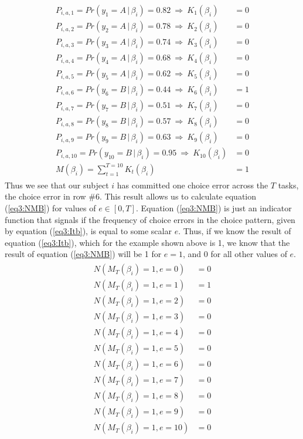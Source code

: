 \documentclass[../main.tex]{subfiles}
\begin{document}
\begin{align}
	\label{eq3:example_MTBn}
	\begin{split}
		P_{i,a,1}  = Pr(y_1 = A    \,|\, \beta_i) = 0.82 ~ \Rightarrow ~ K_{1}(\beta_i)  &= 0 \\
		P_{i,a,2}  = Pr(y_2 = A    \,|\, \beta_i) = 0.78 ~ \Rightarrow ~ K_{2}(\beta_i)  &= 0 \\
		P_{i,a,3}  = Pr(y_3 = A    \,|\, \beta_i) = 0.74 ~ \Rightarrow ~ K_{3}(\beta_i)  &= 0 \\
		P_{i,a,4}  = Pr(y_4 = A    \,|\, \beta_i) = 0.68 ~ \Rightarrow ~ K_{4}(\beta_i)  &= 0 \\
		P_{i,a,5}  = Pr(y_5 = A    \,|\, \beta_i) = 0.62 ~ \Rightarrow ~ K_{5}(\beta_i)  &= 0 \\
		P_{i,a,6}  = Pr(y_6 = B    \,|\, \beta_i) = 0.44 ~ \Rightarrow ~ K_{6}(\beta_i)  &= 1 \\
		P_{i,a,7}  = Pr(y_7 = B    \,|\, \beta_i) = 0.51 ~ \Rightarrow ~ K_{7}(\beta_i)  &= 0 \\
		P_{i,a,8}  = Pr(y_8 = B    \,|\, \beta_i) = 0.57 ~ \Rightarrow ~ K_{8}(\beta_i)  &= 0 \\
		P_{i,a,9}  = Pr(y_9 = B    \,|\, \beta_i) = 0.63 ~ \Rightarrow ~ K_{9}(\beta_i)  &= 0 \\
		P_{i,a,10} = Pr(y_{10} = B \,|\, \beta_i) = 0.95 ~ \Rightarrow ~ K_{10}(\beta_i) &= 0 \\
		                                M(\beta_i) = \sum_{t = 1}^{T = 10}{K_t(\beta_i)} &= 1
	\end{split}
\end{align}
\noindent Thus we see that our subject $i$ has committed one choice error across the $T$ tasks, the choice error in row \#6.
This result allows us to calculate equation (\ref{eq3:NMB}) for values of $e \in [ 0, T ]$.
Equation (\ref{eq3:NMB}) is just an indicator function that signals if the frequency of choice errors in the choice pattern, given by equation (\ref{eq3:Itb}), is equal to some scalar $e$.
Thus, if we know the result of equation (\ref{eq3:Itb}), which for the example shown above is 1, we know that the result of equation (\ref{eq3:NMB}) will be 1 for $e = 1$, and 0 for all other values of $e$.
\begin{align}
	\label{eq3:example_NMB}
	\begin{split}
		N( M_T(\beta_i) = 1, e = 0 )  &= 0 \\
		N( M_T(\beta_i) = 1, e = 1 )  &= 1 \\
		N( M_T(\beta_i) = 1, e = 2 )  &= 0 \\
		N( M_T(\beta_i) = 1, e = 3 )  &= 0 \\
		N( M_T(\beta_i) = 1, e = 4 )  &= 0 \\
		N( M_T(\beta_i) = 1, e = 5 )  &= 0 \\
		N( M_T(\beta_i) = 1, e = 6 )  &= 0 \\
		N( M_T(\beta_i) = 1, e = 7 )  &= 0 \\
		N( M_T(\beta_i) = 1, e = 8 )  &= 0 \\
		N( M_T(\beta_i) = 1, e = 9 )  &= 0 \\
		N( M_T(\beta_i) = 1, e = 10 ) &= 0 \\
	\end{split}
\end{align}
\end{document}
